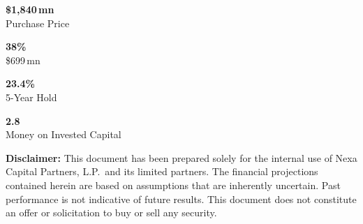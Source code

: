 \noindent
\begin{minipage}[t]{0.235\linewidth}
  \begin{tcolorbox}[kpicard, title={Enterprise Value}]
    \centering
    {\fontsize{18}{20}\selectfont\bfseries\color{NavyDark}\$1{,}840\,mn}\\
    {\small\color{SlateGrey}Purchase Price}
  \end{tcolorbox}
\end{minipage}%
\hfill
\begin{minipage}[t]{0.235\linewidth}
  \begin{tcolorbox}[kpicard, title={Equity Contribution}]
    \centering
    {\fontsize{18}{20}\selectfont\bfseries\color{NavyDark}38\%}\\
    {\small\color{SlateGrey}\$699\,mn}
  \end{tcolorbox}
\end{minipage}%
\hfill
\begin{minipage}[t]{0.235\linewidth}
  \begin{tcolorbox}[kpicard, title={Base Case IRR}]
    \centering
    {\fontsize{18}{20}\selectfont\bfseries\color{SuccessGreen}23.4\%}\\
    {\small\color{SlateGrey}5-Year Hold}
  \end{tcolorbox}
\end{minipage}%
\hfill
\begin{minipage}[t]{0.235\linewidth}
  \begin{tcolorbox}[kpicard, title={MOIC (Base)}]
    \centering
    {\fontsize{18}{20}\selectfont\bfseries\color{SuccessGreen}2.8\texttimes}\\
    {\small\color{SlateGrey}Money on Invested Capital}
  \end{tcolorbox}
\end{minipage}

\vspace{8pt}
\colourrule[GoldAccent]

\begin{tcolorbox}[sidenotebox, title={}]
  \small\color{NavyDark}
  \textbf{Disclaimer:} This document has been prepared solely for the internal use of Nexa Capital Partners,
  L.P.\ and its limited partners. The financial projections contained herein are based on assumptions
  that are inherently uncertain. Past performance is not indicative of future results. This document
  does not constitute an offer or solicitation to buy or sell any security.
\end{tcolorbox}
